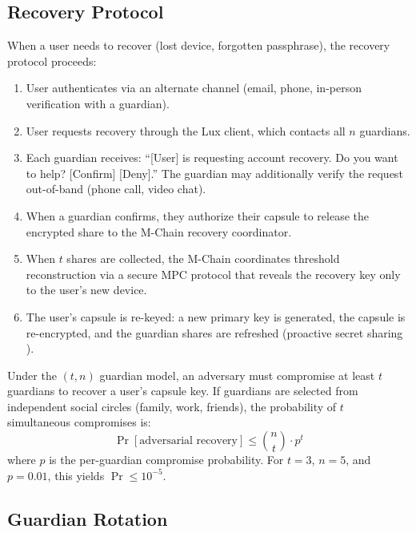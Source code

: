 \subsection{Recovery Protocol}

When a user needs to recover (lost device, forgotten passphrase), the
recovery protocol proceeds:

\begin{enumerate}
    \item User authenticates via an alternate channel (email, phone, in-person
    verification with a guardian).
    \item User requests recovery through the Lux client, which contacts all
    $n$ guardians.
    \item Each guardian receives: ``[User] is requesting account recovery.
    Do you want to help? [Confirm] [Deny].'' The guardian may additionally
    verify the request out-of-band (phone call, video chat).
    \item When a guardian confirms, they authorize their capsule to release
    the encrypted share to the M-Chain recovery coordinator.
    \item When $t$ shares are collected, the M-Chain coordinates threshold
    reconstruction via a secure MPC protocol that reveals the recovery key
    only to the user's new device.
    \item The user's capsule is re-keyed: a new primary key is generated,
    the capsule is re-encrypted, and the guardian shares are refreshed
    (proactive secret sharing \cite{herzberg1995proactive}).
\end{enumerate}

\begin{theorem}
Under the $(t, n)$ guardian model, an adversary must compromise at least
$t$ guardians to recover a user's capsule key. If guardians are selected
from independent social circles (family, work, friends), the probability
of $t$ simultaneous compromises is:
\begin{equation}
    \Pr[\text{adversarial recovery}] \leq \binom{n}{t} \cdot p^t
\end{equation}
where $p$ is the per-guardian compromise probability. For $t = 3$, $n = 5$,
and $p = 0.01$, this yields $\Pr \leq 10^{-5}$.
\end{theorem}

\subsection{Guardian Rotation}

